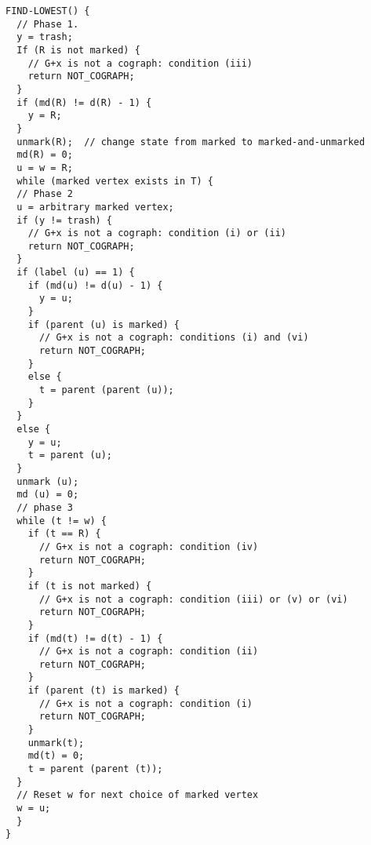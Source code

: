 \begin{verbatim}
FIND-LOWEST() {
  // Phase 1.
  y = trash;
  If (R is not marked) {
    // G+x is not a cograph: condition (iii)
    return NOT_COGRAPH;
  }
  if (md(R) != d(R) - 1) {
    y = R;
  }
  unmark(R);  // change state from marked to marked-and-unmarked
  md(R) = 0;
  u = w = R;
  while (marked vertex exists in T) {
  // Phase 2
  u = arbitrary marked vertex;
  if (y != trash) {
    // G+x is not a cograph: condition (i) or (ii)
    return NOT_COGRAPH;
  }
  if (label (u) == 1) {
    if (md(u) != d(u) - 1) {
      y = u;
    }
    if (parent (u) is marked) {
      // G+x is not a cograph: conditions (i) and (vi)
      return NOT_COGRAPH;
    }
    else {
      t = parent (parent (u));
    }
  }
  else {
    y = u;
    t = parent (u);
  }
  unmark (u);
  md (u) = 0;
  // phase 3
  while (t != w) {
    if (t == R) {
      // G+x is not a cograph: condition (iv)
      return NOT_COGRAPH;
    }
    if (t is not marked) {
      // G+x is not a cograph: condition (iii) or (v) or (vi)
      return NOT_COGRAPH;
    }
    if (md(t) != d(t) - 1) {
      // G+x is not a cograph: condition (ii)
      return NOT_COGRAPH;
    }
    if (parent (t) is marked) {
      // G+x is not a cograph: condition (i)
      return NOT_COGRAPH;
    }
    unmark(t); 
    md(t) = 0;
    t = parent (parent (t));
  }
  // Reset w for next choice of marked vertex
  w = u;
  }
}
\end{verbatim}